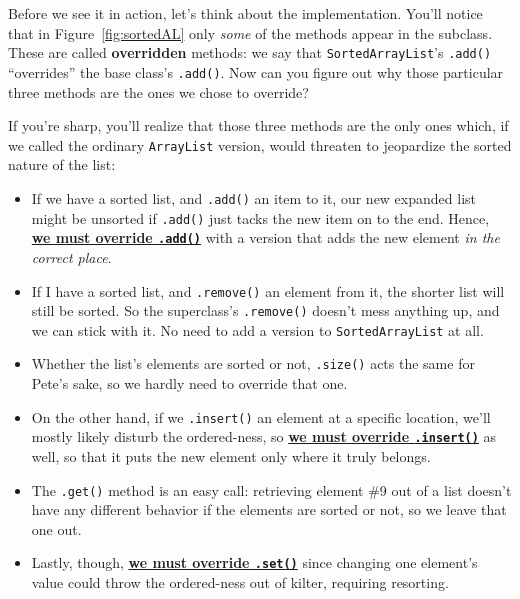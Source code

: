 Before we see it in action, let's think about the implementation. You'll
notice that in Figure~\ref{fig:sortedAL} only \textit{some} of the methods
appear in the subclass. These are called \textbf{overridden} methods: we say
that \texttt{SortedArrayList}'s \texttt{.add()} ``overrides'' the base class's
\texttt{.add()}. Now can you figure out why those particular three methods are
the ones we chose to override?

If you're sharp, you'll realize that those three methods are the only ones
which, if we called the ordinary \texttt{ArrayList} version, would threaten to
jeopardize the sorted nature of the list:

\begin{itemize}
\itemsep.1em

\item If we have a sorted list, and \texttt{.add()} an item to it, our new
expanded list might be unsorted if \texttt{.add()} just tacks the new item on
to the end. Hence, \underline{\textbf{we must override \texttt{.add()}}} with
a version that adds the new element \textit{in the correct place}.

\item If I have a sorted list, and \texttt{.remove()} an element from it, the
shorter list will still be sorted. So the superclass's \texttt{.remove()}
doesn't mess anything up, and we can stick with it. No need to add a version
to \texttt{SortedArrayList} at all.

\item Whether the list's elements are sorted or not, \texttt{.size()} acts the
same for Pete's sake, so we hardly need to override that one.

\item On the other hand, if we \texttt{.insert()} an element at a specific
location, we'll mostly likely disturb the ordered-ness, so
\underline{\textbf{we must override \texttt{.insert()}}} as well, so that it
puts the new element only where it truly belongs.

\item The \texttt{.get()} method is an easy call: retrieving element \#9 out
of a list doesn't have any different behavior if the elements are sorted or
not, so we leave that one out.

\item Lastly, though, \underline{\textbf{we must override \texttt{.set()}}}
since changing one element's value could throw the ordered-ness out of kilter,
requiring resorting.

\end{itemize}

